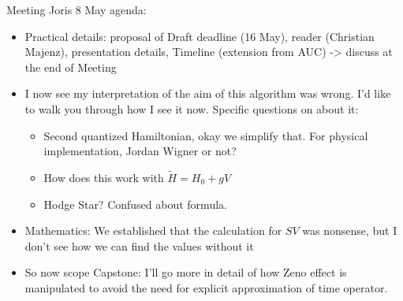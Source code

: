 \documentclass{report}
\author{Floris van den Ende}
\begin{document}


\tableofcontents





\newpage

Meeting Joris 8 May agenda:

\begin{itemize}
  \item Practical details: proposal of Draft deadline (16 May), reader (Christian Majenz), presentation details, Timeline (extension from AUC) -> discuss at the end of Meeting
  \item I now see my interpretation of the aim of this algorithm was wrong. I'd like to walk you through how I see it now.
  Specific questions on about it:
\begin{itemize}
  \item Second quantized Hamiltonian, okay we simplify that. For physical implementation, Jordan Wigner or not?
  \item How does this work with $ \tilde{H} = H_0 + gV$
  \item Hodge Star? Confused about formula.
\end{itemize}
  \item Mathematics: We established that the calculation for $SV$ was nonsense, but I don't see how we can find the values without it
  \item So now scope Capstone: I'll go more in detail of how Zeno effect is manipulated to avoid the need for explicit approximation of time operator.
\end{itemize}



\printbibliography
\end{document}
